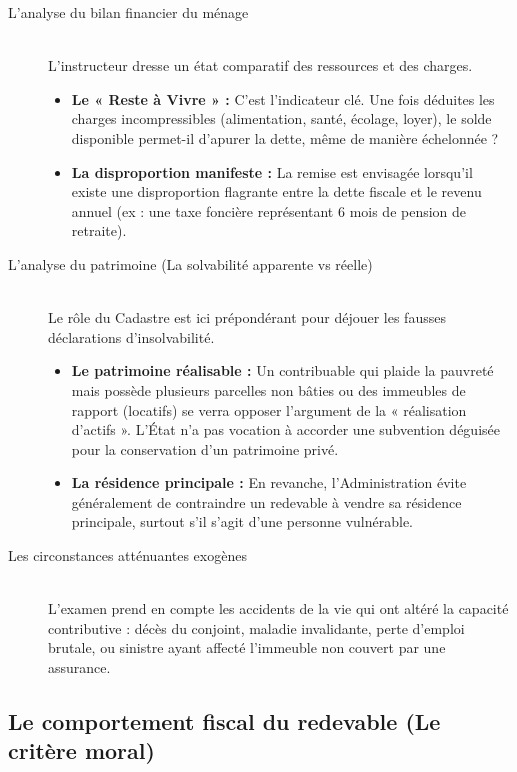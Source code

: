 \documentclass[Cours_contentieuxTF2026.tex]{subfiles}
\begin{document}
 \begin{description}
 	\item[L'analyse du bilan financier du ménage] \hfill \\
 	L'instructeur dresse un état comparatif des ressources et des charges.
 	\begin{itemize}
 		\item \textbf{Le « Reste à Vivre » :} C'est l'indicateur clé. Une fois déduites les charges incompressibles (alimentation, santé, écolage, loyer), le solde disponible permet-il d'apurer la dette, même de manière échelonnée ?
 		\item \textbf{La disproportion manifeste :} La remise est envisagée lorsqu'il existe une disproportion flagrante entre la dette fiscale et le revenu annuel (ex : une taxe foncière représentant 6 mois de pension de retraite).
 	\end{itemize}
 	
 	\item[L'analyse du patrimoine (La solvabilité apparente vs réelle)] \hfill \\
 	Le rôle du Cadastre est ici prépondérant pour déjouer les fausses déclarations d'insolvabilité.
 	\begin{itemize}
 		\item \textbf{Le patrimoine réalisable :} Un contribuable qui plaide la pauvreté mais possède plusieurs parcelles non bâties ou des immeubles de rapport (locatifs) se verra opposer l'argument de la « réalisation d'actifs ». L'État n'a pas vocation à accorder une subvention déguisée pour la conservation d'un patrimoine privé.
 		\item \textbf{La résidence principale :} En revanche, l'Administration évite généralement de contraindre un redevable à vendre sa résidence principale, surtout s'il s'agit d'une personne vulnérable.
 	\end{itemize}
 	
 	\item[Les circonstances atténuantes exogènes] \hfill \\
 	L'examen prend en compte les accidents de la vie qui ont altéré la capacité contributive : décès du conjoint, maladie invalidante, perte d'emploi brutale, ou sinistre ayant affecté l'immeuble non couvert par une assurance.
 \end{description}
 
 \subsection{Le comportement fiscal du redevable (Le critère moral)}
 
\end{document}
